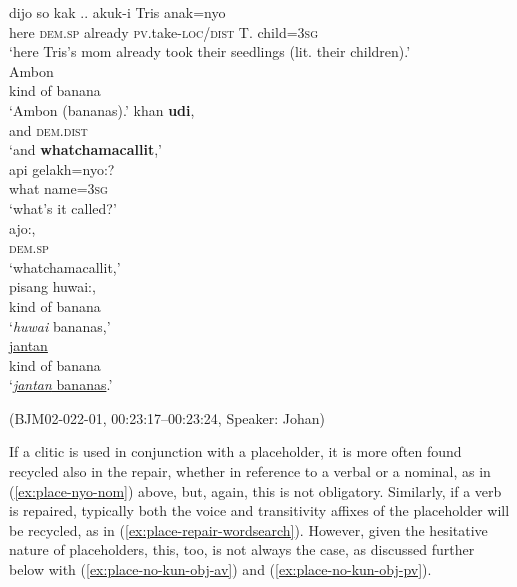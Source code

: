 \documentclass[output=paper,colorlinks,citecolor=brown
\ChapterDOI{10.5281/zenodo.15697585}
]{langscibook}
\begin{document}
\begin{exe}
    \ex\label{ex:place-repair-wordsearch2} \begin{xlist}[0\quad →A:]
         \gll
        dijo so kak .. akuk-i Tris anak=nyo \\
        here \textsc{dem.sp} already {} \textsc{pv}.take-\textsc{loc/dist} T. child=3\textsc{sg} \\
        \glt `here Tris's mom already took their seedlings (lit. their children).' \\
        \exi{2\quad \hphantom{→J:}} \gll
        Ambon \\
        {kind of banana} \\
        \glt `Ambon (bananas).'
         \gll
        khan \textbf{udi}, \\
        and \textsc{dem.dist} \\
        \glt `and \textbf{whatchamacallit},' \\
        \exi{4\quad \hphantom{→J:}} \gll
        api gelakh=nyo:? \\
        what name=3\textsc{sg} \\
        \glt `what's it called?' \\
        \exi{5\quad \hphantom{→J:}} \gll
        ajo:, \\
        \textsc{dem.sp} \\
        \glt `whatchamacallit,' \\
        \exi{6\quad \hphantom{→J:}} \gll
        {pisang huwai:}, \\
        {kind of banana} \\
        \glt `\textit{huwai} bananas,' \\
        \exi{7\quad \hphantom{→J:}} \gll
        \uline{jantan} \\
        {kind of banana} \\
        \glt `\uline{\textit{jantan} bananas}.' \\
    \end{xlist}
    \hfill (BJM02-022-01, 00:23:17–00:23:24, Speaker: Johan) 
\end{exe}

If a clitic is used in conjunction with a placeholder, it is more often found recycled also in the repair, whether in reference to a verbal or a nominal, as in (\ref{ex:place-nyo-nom}) above, but, again, this is not obligatory. Similarly, if a verb is repaired, typically both the voice and transitivity affixes of the placeholder will be recycled, as in (\ref{ex:place-repair-wordsearch}). However, given the hesitative nature of placeholders, this, too, is not always the case, as discussed further below with (\ref{ex:place-no-kun-obj-av}) and (\ref{ex:place-no-kun-obj-pv}).
\end{document}
